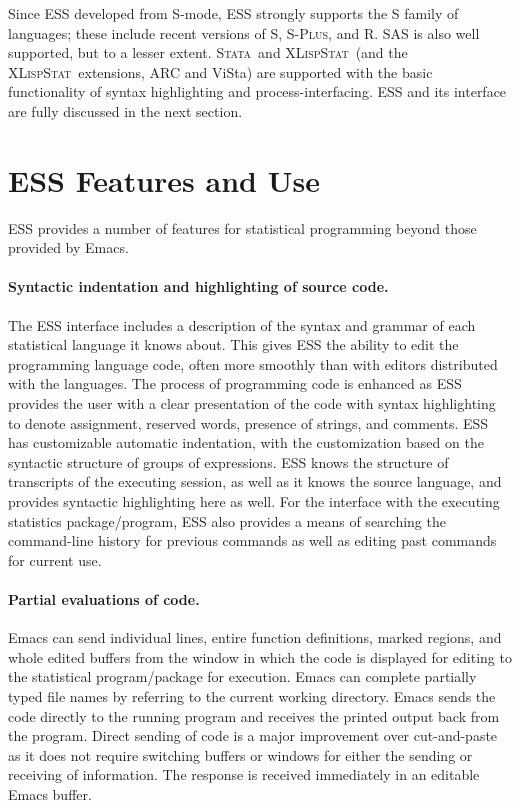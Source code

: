 \documentclass{article}
\newcommand*{\Splus}{\textsc{S-Plus}}
\newcommand*{\XLispStat}{\textsc{XLispStat}}
\newcommand*{\Stata}{\textsc{Stata}}
\begin{document}
Since ESS developed from S-mode, ESS strongly supports the S family of
languages; these include recent versions of S, \Splus, and R.  SAS is
also well supported, but to a lesser extent.  \Stata\ and \XLispStat\ 
(and the \XLispStat\ extensions, ARC and ViSta) are supported with the
basic functionality of syntax highlighting and process-interfacing.
ESS and its interface are fully discussed in the next section.

\section{ESS Features and Use}
\label{sec:basic}

ESS provides a number of features for statistical programming beyond
those provided by Emacs.

\paragraph{Syntactic indentation and highlighting of source code.}
The ESS interface includes a description of the syntax and grammar of
each statistical language it knows about.  This gives ESS the ability
to edit the programming language code, often more smoothly than with
editors distributed with the languages.  The process of programming
code is enhanced as ESS provides the user with a clear presentation of
the code with syntax highlighting to denote assignment, reserved
words, presence of strings, and comments.  ESS has customizable
automatic indentation, with the customization based on the syntactic
structure of groups of expressions.  ESS knows the structure of
transcripts of the executing session, as well as it knows the source
language, and provides syntactic highlighting here as well.  For the
interface with the executing statistics package/program, ESS also
provides a means of searching the command-line history for previous
commands as well as editing past commands for current use.

\paragraph{Partial evaluations of code.}
Emacs can send individual lines, entire function definitions, marked
regions, and whole edited buffers from the window in which the code is
displayed for editing to the statistical program/package for
execution.  Emacs can complete partially typed file names by referring
to the current working directory.  Emacs sends the code directly to
the running program and receives the printed output back from the
program.  Direct sending of code is a major improvement over
cut-and-paste as it does not require switching buffers or windows for
either the sending or receiving of information.  The response is
received immediately in an editable Emacs buffer.
\end{document}
